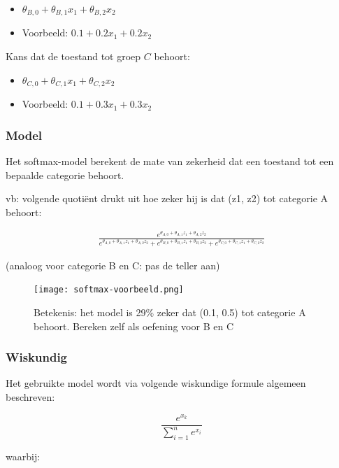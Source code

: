 \documentclass{article}
\begin{document}
\begin{itemize}
    \item $\theta_{B,0} + \theta_{B,1}x_1 + \theta_{B,2}x_2$
    \item Voorbeeld: $0.1 + 0.2x_1 + 0.2x_2$
\end{itemize}

Kans dat de toestand tot groep $C$ behoort:

\begin{itemize}
    \item $\theta_{C,0} + \theta_{C,1}x_1 + \theta_{C,2}x_2$
    \item Voorbeeld: $0.1 + 0.3x_1 + 0.3x_2$
\end{itemize}

\subsubsection{Model}

Het softmax-model berekent de mate van zekerheid dat een toestand tot een bepaalde categorie behoort.

vb: volgende quotiënt drukt uit hoe zeker hij is dat (z1, z2) tot categorie A behoort:

\begin{align*}
    \frac{e^{\theta_{A,0} + \theta_{A,1}z_1 + \theta_{A,2}z_2}}{e^{\theta_{A,0} + \theta_{A,1}z_1 + \theta_{A,2}z_2} + e^{\theta_{B,0} + \theta_{B,1}z_1 + \theta_{B,2}z_2} + e^{\theta_{C,0} + \theta_{C,1}z_1 + \theta_{C,2}z_2} }
\end{align*}

(analoog voor categorie B en C: pas de teller aan)

\begin{figure}[H]
    \centering
    \texttt{[image: softmax-voorbeeld.png]}
    \caption{Betekenis: het model is 29\% zeker dat (0.1, 0.5) tot categorie A behoort. Bereken zelf als oefening voor B en C}
\end{figure}

\subsubsection{Wiskundig}

Het gebruikte model wordt via volgende wiskundige formule algemeen beschreven:

\begin{equation}
\frac{e^{x_k}}{\sum_{i=1}^n e^{x_i}}
\end{equation}

waarbij:
\end{document}
